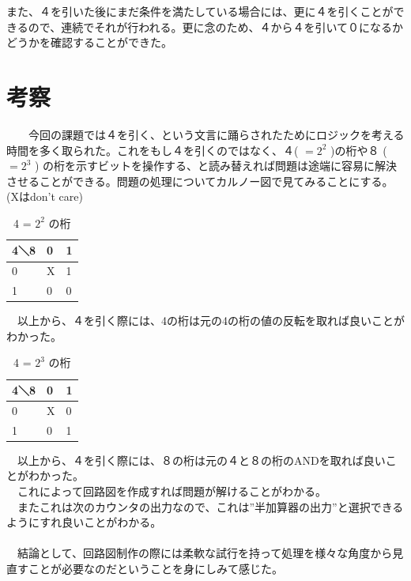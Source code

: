 \documentclass{scrartcl}
\begin{document}
また、４を引いた後にまだ条件を満たしている場合には、更に４を引くことができるので、連続でそれが行われる。更に念のため、４から４を引いて０になるかどうかを確認することができた。\\

\section{考察}
\label{sec:org0578c39}
　　今回の課題では４を引く、という文言に踊らされたためにロジックを考える時間を多く取られた。これをもし４を引くのではなく、４( \(=2^2\) )の桁や８ ( \(=2^3\) ) の桁を示すビットを操作する、と読み替えれば問題は途端に容易に解決させることができる。問題の処理についてカルノー図で見てみることにする。(Xはdon't care)\\

\begin{table}[htbp]
\caption{4 = \(2^2\) の桁}
\centering
\begin{tabular}{|l|l|l|}
\hline
4＼8 & 0 & 1\\
\hline
0 & X & 1\\
1 & 0 & 0\\
\hline
\end{tabular}
\end{table}

　以上から、４を引く際には、4の桁は元の4の桁の値の反転を取れば良いことがわかった。\\

\begin{table}[htbp]
\caption{4 = \(2^3\) の桁}
\centering
\begin{tabular}{|l|l|l|}
\hline
4＼8 & 0 & 1\\
\hline
0 & X & 0\\
1 & 0 & 1\\
\hline
\end{tabular}
\end{table}

　以上から、４を引く際には、８の桁は元の４と８の桁のANDを取れば良いことがわかった。\\

　これによって回路図を作成すれば問題が解けることがわかる。\\
　またこれは次のカウンタの出力なので、これは”半加算器の出力”と選択できるようにすれ良いことがわかる。\\
　\\
　結論として、回路図制作の際には柔軟な試行を持って処理を様々な角度から見直すことが必要なのだということを身にしみて感じた。\\
\end{document}
